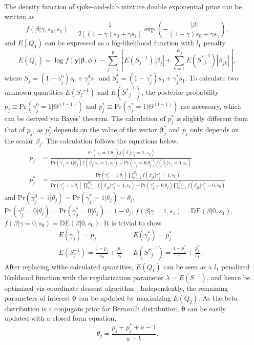 \documentclass[AMA,STIX1COL,]{WileyNJD-v2}
\begin{document}
The density function of spike-and-slab mixture double exponential prior
can be written as \[
f(\beta|\gamma, s_0, s_1) = \frac{1}{2\left[(1-\gamma)s_0 + \gamma s_1\right]}\exp(-\frac{|\beta|}{(1-\gamma)s_0 + \gamma s_1}),
\] and \(E(Q_1)\) can be expressed as a log-likelihood function with
\(l_1\) penalty \begin{equation}\label{eq:Q1_CD}
E(Q_1) = \log f(\textbf{y}|\boldsymbol{\beta}, \phi) - \sum\limits_{j=1}^p\left[E({S_j}^{-1})|\beta_j|+\sum\limits_{k=1}^{K_j}E({S^{*}}^{-1}_{j})|\beta_{jk}|\right],
\end{equation} where
\(S_{j} = (1-\gamma^{0}_{j}) s_0 + \gamma^{0}_{j} s_1\) and
\(S^*_{j} = (1-\gamma^*_{j}) s_0 + \gamma^*_{j} s_1\). To calculate two
unknown quantities \(E({S_j}^{-1})\) and \(E({S^*}^{-1}_j)\), the
posterior probability
\(p_{j} \equiv \text{Pr}(\gamma^{0}_{j}=1|\Theta^{(t-1)})\) and
\(p_{j}^*\equiv \text{Pr}(\gamma^*_{j}=1|\Theta^{(t-1)})\) are
necessary, which can be derived via Bayes' theorem. The calculation of
\(p_j^*\) is slightly different from that of \(p_j\), as \(p_j^*\)
depends on the value of the vector \(\boldsymbol{\beta}^*_{j}\) and
\(p_j\) only depends on the scalar \(\beta_j\). The calculation follows
the equations below. \begin{align*}
p_{j} &= \frac{\text{Pr}(\gamma_{j} = 1|\theta_j)f(\beta_{j}|\gamma_{j}=1, s_1) }{\text{Pr}(\gamma_{j} = 1|\theta_j)f(\beta_{j}|\gamma_{j}=1, s_1) + \text{Pr}(\gamma_{j} = 0|\theta_j)f(\beta_{j}|\gamma_{j}=0, s_0)}\\
p^*_{j} &= \frac{\text{Pr}(\gamma^{*}_{j} = 1|\theta_j)\prod\limits_{k=1}^{K_j}f(\beta_{jk}|\gamma^{*}_{j}=1, s_1) }{\text{Pr}(\gamma^{*}_{j} = 1|\theta_j)\prod\limits_{k=1}^{K_j}f(\beta_{jk}|\gamma^{*}_{j}=1, s_1) + \text{Pr}(\gamma^{*}_{j} = 0|\theta_j)\prod\limits_{k=1}^{K_j}f(\beta_{jk}|\gamma^{*}_{j}=0, s_0)}
\end{align*} and
\(\text{Pr}(\gamma_{j}^{0} = 1|\theta_j) = \text{Pr}(\gamma_{j}^*= 1|\theta_j) = \theta_j\),
\(\text{Pr}(\gamma_{j}^{0} = 0|\theta_j) = \text{Pr}(\gamma_{j}^*= 0|\theta_j) = 1-\theta_j\),
\(f(\beta|\gamma=1, s_1) = \text{DE}(\beta|0 , s_1)\),
\(f(\beta|\gamma=0, s_0) = \text{DE}(\beta|0 , s_0)\). It is trivial to
show \begin{align}\label{eq:exp_scale}
&E(\gamma_{j})  = p_{j} & &E(\gamma^{*}_{j}) = p_{j}^{*}\nonumber\\
&E({S}^{-1}_{j}) = \frac{1-p_{j}}{s_0} + \frac{p_{j}}{s_1} & &E({S^*}^{-1}_{j}) = \frac{1-p_{j}^{*}}{s_0} + \frac{p_{j}^{*}}{s_1}.
\end{align} After replacing withe calculated quantities, \(E(Q_1)\) can
be seen as a \(l_1\) penalized likelihood function with the
regularization parameter \(\lambda = E(S^{-1})\), and hence be optimized
via coordinate descent algorithm \citep{Friedman2010}. Independently,
the remaining parameters of interest \(\boldsymbol{\theta}\) can be
updated by maximizing \(E(Q_2)\). As the beta distribution is a
conjugate prior for Bernoulli distribution, \(\boldsymbol{\theta}\) can
be easily updated with a closed form equation,
\begin{equation}\label{eq:update_theta}
\theta_j = \frac{p_j + p^*_{j} + a - 1 }{a + b}.
\end{equation}
\end{document}
